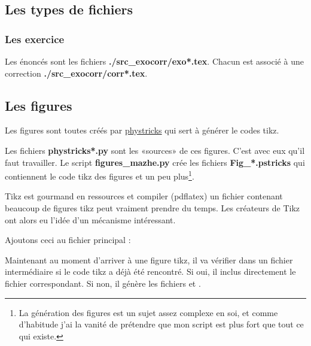 \subsection{Les types de fichiers}

\subsubsection{Les exercice}

Les énoncés sont les fichiers {\bf  ./src\_exocorr/exo*.tex}. Chacun est associé à une correction {\bf ./src\_exocorr/corr*.tex}.

\subsection{Les figures}

Les figures sont toutes créés par \href{https://github.com/LaurentClaessens/phystricks}{phystricks} qui sert à générer le codes tikz.

Les fichiers {\bf phystricks*.py} sont les «sources» de ces figures. C'est avec eux qu'il faut travailler. Le script {\bf figures\_mazhe.py} crée les fichiers {\bf Fig\_*.pstricks} qui contiennent le code tikz des figures et un peu plus\footnote{La génération des figures est un sujet assez complexe en soi, et comme d'habitude j'ai la vanité de prétendre que mon script est plus fort que tout ce qui existe.}.

Tikz est gourmand en ressources et compiler (pdflatex) un fichier contenant beaucoup de figures tikz peut vraiment prendre du temps. Les créateurs de Tikz ont alors eu l'idée d'un mécanisme intéressant. 

Ajoutons ceci au fichier principal :


Maintenant au moment d'arriver à une figure tikz, il va vérifier dans un fichier intermédiaire  si le code tikz a déjà été rencontré. Si oui, il inclus directement le fichier  correspondant. Si non, il génère les fichiers  et .

